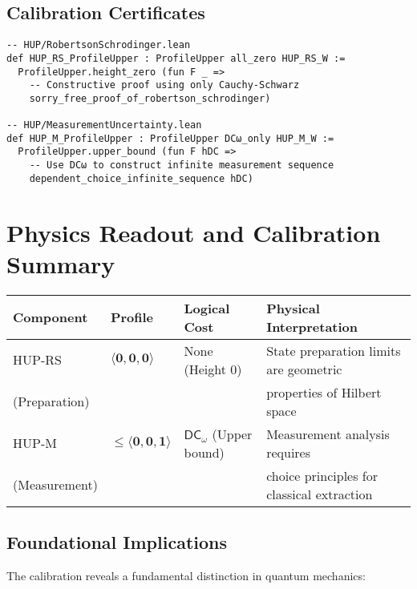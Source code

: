\documentclass[11pt]{article}
\newcommand{\DCw}{\mathsf{DC}_{\omega}}
\newcommand{\hzero}{\mathbf{0}}
\newcommand{\hone}{\mathbf{1}}
\newcommand{\allzero}{\langle \hzero,\hzero,\hzero\rangle}
\newcommand{\DCwonly}{\langle \hzero,\hzero,\hone\rangle}
\theoremstyle{plain}
\theoremstyle{definition}
\theoremstyle{remark}
\begin{document}
\subsection{Calibration Certificates}

\begin{verbatim}
-- HUP/RobertsonSchrodinger.lean
def HUP_RS_ProfileUpper : ProfileUpper all_zero HUP_RS_W :=
  ProfileUpper.height_zero (fun F _ => 
    -- Constructive proof using only Cauchy-Schwarz
    sorry_free_proof_of_robertson_schrodinger)

-- HUP/MeasurementUncertainty.lean  
def HUP_M_ProfileUpper : ProfileUpper DCω_only HUP_M_W :=
  ProfileUpper.upper_bound (fun F hDC => 
    -- Use DCω to construct infinite measurement sequence
    dependent_choice_infinite_sequence hDC)
\end{verbatim}

\section{Physics Readout and Calibration Summary}

\begin{center}
\begin{tabular}{|l|l|l|l|}
\hline
\textbf{Component} & \textbf{Profile} & \textbf{Logical Cost} & \textbf{Physical Interpretation} \\
\hline
HUP-RS & $\allzero$ & None (Height 0) & State preparation limits are geometric \\
(Preparation) & & & properties of Hilbert space \\
\hline  
HUP-M & $\leq \DCwonly$ & $\DCw$ (Upper bound) & Measurement analysis requires \\
(Measurement) & & & choice principles for classical extraction \\
\hline
\end{tabular}
\end{center}

\subsection{Foundational Implications}

The calibration reveals a fundamental distinction in quantum mechanics:
\end{document}
